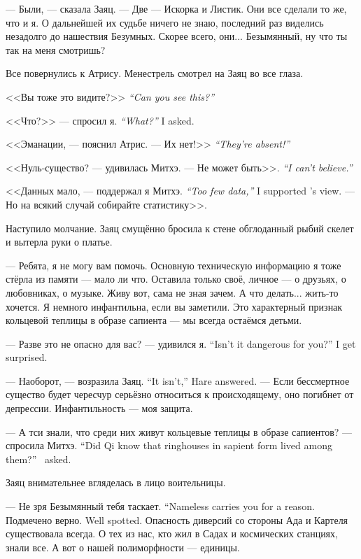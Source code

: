--- Были, --- сказала Заяц.
--- Две --- Искорка и Листик.
Они все сделали то же, что и я.
О дальнейшей их судьбе ничего не знаю, последний раз виделись незадолго до нашествия Безумных.
Скорее всего, они...
Безымянный, ну что ты так на меня смотришь?

Все повернулись к Атрису.
Менестрель смотрел на Заяц во все глаза.

{<<Вы тоже это видите?>>}
{\textit{``Can you see this?''}}

{<<Что?>> --- спросил я.}
{\textit{``What?''} I asked.}

<<Эманации, --- пояснил Атрис.
{--- Их нет!>>}
{\textit{``They're absent!''}}

<<Нуль-существо? --- удивилась Митхэ.
{--- Не может быть>>.}
{\textit{``I can't believe.''}}

{<<Данных мало, --- поддержал я Митхэ.}
{\textit{``Too few data,''} I supported \Mitchoe's view.}
--- Но на всякий случай собирайте статистику>>.

Наступило молчание.
Заяц смущённо бросила к стене обглоданный рыбий скелет и вытерла руки о платье.

--- Ребята, я не могу вам помочь.
Основную техническую информацию я тоже стёрла из памяти --- мало ли что.
Оставила только своё, личное --- о друзьях, о любовниках, о музыке.
Живу вот, сама не зная зачем.
А что делать... жить-то хочется.
Я немного инфантильна, если вы заметили.
Это характерный признак кольцевой теплицы в образе сапиента --- мы всегда остаёмся детьми.

{--- Разве это не опасно для вас? --- удивился я.}
{``Isn't it dangerous for you?'' I get surprised.}

{--- Наоборот, --- возразила Заяц.}
{``It isn't,'' Hare answered.}
--- Если бессмертное существо будет чересчур серьёзно относиться к происходящему, оно погибнет от депрессии.
Инфантильность --- моя защита.

{--- А тси знали, что среди них живут кольцевые теплицы в образе сапиентов? --- спросила Митхэ.}
{``Did Qi know that ringhouses in sapient form lived among them?'' \Mitchoe\ asked.}

Заяц внимательнее вгляделась в лицо воительницы.

{--- Не зря Безымянный тебя таскает.}
{``Nameless carries you for a reason.}
{Подмечено верно.}
{Well spotted.}
Опасность диверсий со стороны Ада и Картеля существовала всегда.
О тех из нас, кто жил в Садах и космических станциях, знали все.
А вот о нашей полиморфности --- единицы.

